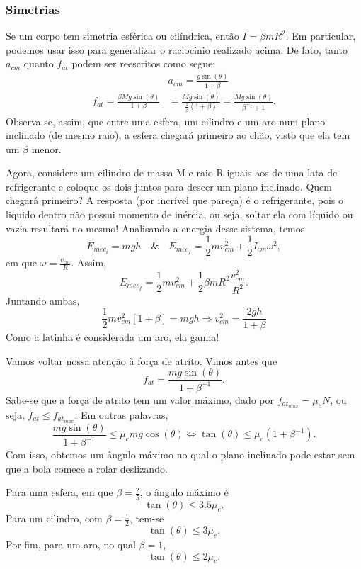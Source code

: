 \documentclass[physicsII_notes.tex]{subfiles}
\begin{document}
\subsubsection{Simetrias}
Se um corpo tem simetria esférica ou cilíndrica, então \(I = \beta mR^{2}\). Em particular, podemos usar isso para
generalizar o raciocínio realizado acima. De fato, tanto \(a_{cm}\) quanto \(f_{at}\) podem ser reescritos como segue:
\begin{align*}
	                                                  & a_{cm} = \frac{g\sin{(\theta )}}{1+\beta }                                                       \\
	f_{at} = \frac{\beta Mg\sin{(\theta )}}{1+\beta } & = \frac{Mg\sin{(\theta )}}{\frac{1}{\beta }(1+\beta )} = \frac{Mg\sin{(\theta )}}{\beta^{-1}+1}.
\end{align*}
Observa-se, assim, que entre uma esfera, um cilindro e um aro num plano inclinado (de mesmo raio), a esfera chegará primeiro ao chão,
visto que ela tem um \(\beta \) menor.

Agora, considere um cilindro de massa M e raio R iguais aos de uma lata de refrigerante e coloque os dois juntos para descer um plano inclinado. Quem chegará primeiro?
A resposta (por incrível que pareça) é o refrigerante, pois o liquido dentro não possui momento de inércia, ou seja, soltar ela com líquido ou vazia resultará no mesmo! Analisando a energia
desse sistema, temos
\[
	E_{mec_{i}} = mgh\quad \&\quad E_{mec_{f}} = \frac{1}{2}mv_{cm}^{2} + \frac{1}{2}I_{cm}\omega^{2},
\]
em que \(\omega = \frac{v_{cm}}{R}\). Assim,
\[
	E_{mec_{f}}=\frac{1}{2}mv_{cm}^{2} + \frac{1}{2}\beta mR^{2}\frac{v_{cm}^{2}}{R^{2}}.
\]
Juntando ambas,
\[
	\frac{1}{2}mv_{cm}^{2}[1+\beta ] = mgh \Rightarrow v_{cm}^{2} = \frac{2gh}{1+\beta }
\]
Como a latinha é considerada um aro, ela ganha!

Vamos voltar nossa atenção à força de atrito. Vimos antes que
\[
	f_{at} = \frac{mg\sin{(\theta )}}{1 + \beta^{-1}}.
\]
Sabe-se que a força de atrito tem um valor máximo, dado por \(f_{at_{max}} = \mu_{e}N\), ou seja,
\(f_{at}\leq f_{at_{max}}\). Em outras palavras,
\[
	\frac{mg\sin{(\theta )}}{1+\beta^{-1}}\leq \mu_{e}mg\cos{(\theta )} \Longleftrightarrow \tan{(\theta )}\leq \mu_{e}(1+\beta^{-1}).
\]
Com isso, obtemos um ângulo máximo no qual o plano inclinado pode estar sem que a bola comece a rolar deslizando.
\begin{example}
	Para uma esfera, em que \(\beta =\frac{2}{5}\), o ângulo máximo é
	\[
		\tan{(\theta )}\leq 3.5\mu_{e}.
	\]
	Para um cilindro, com \(\beta = \frac{1}{2}\), tem-se
	\[
		\tan{(\theta )}\leq 3\mu_{e}.
	\]
	Por fim, para um aro, no qual \(\beta =1\),
	\[
		\tan{(\theta )}\leq 2\mu_{e}.
	\]
\end{example}
\end{document}
